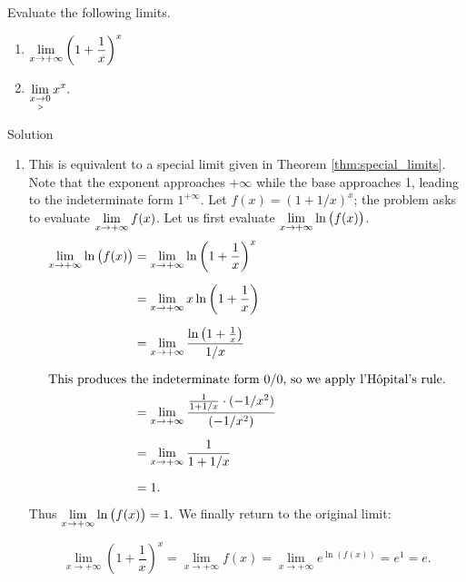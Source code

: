 \begin{example}\label{ex_LHR4}
Evaluate the following limits.

\begin{multicols}{2}
\begin{enumerate}
    \item $\displaystyle \lim_{x\to+\infty} \left(1+\frac1x\right)^x $
\item $\displaystyle  \lim_{x\underset{>}{\rightarrow}0} x^x.$
\end{enumerate}
\end{multicols}

Solution 

\begin{enumerate}
\item		This is equivalent to a special limit given in Theorem \ref{thm:special_limits}. Note that the exponent approaches $+\infty$ while the base approaches 1, leading to the indeterminate form $1^{+\infty}$. Let $f(x) = (1+1/x)^x$; the problem asks to evaluate $\displaystyle\lim_{x\to+\infty}f(x)$. Let us first evaluate $\displaystyle \lim_{x\to+\infty}\ln\big(f(x)\big)$.
\ifcalculus\allowdisplaybreaks\fi
\begin{align*}
\lim_{x\to+\infty}\ln\big(f(x)\big) & = \lim_{x\to+\infty} \ln \left(1+\frac1x\right)^x \\[0.2cm]
			&= \lim_{x\to+\infty} x\ln\left(1+\frac1x\right)\\[0.2cm]
			&=  \lim_{x\to+\infty} \frac{\ln\left(1+\frac1x\right)}{1/x}\\[0.2cm]
			\intertext{This produces the indeterminate form 0/0, so we apply l'H\^opital's rule.}
			&=	\lim_{x\to+\infty} \frac{\frac{1}{1+1/x}\cdot(-1/x^2)}{(-1/x^2)} \\[0.2cm]
			&= \lim_{x\to+\infty}\frac{1}{1+1/x}\\[0.2cm]
			&= 1.
\end{align*}
Thus $\displaystyle\lim_{x\to+\infty} \ln \big(f(x)\big) = 1.$ We finally return to the original limit:

$$\lim_{x\to+\infty}\left(1+\frac1x\right)^x = \lim_{x\to+\infty} f(x) =  \lim_{x\to+\infty}e^{\ln (f(x))} = e^1 = e.$$



\end{enumerate}
\end{example}
